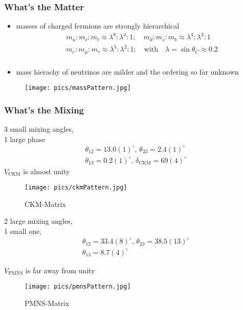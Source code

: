 \documentclass[hyperref={pdfpagelabels=false}]{beamer}
\begin{document}
\begin{frame}
\frametitle{What's the Matter}
  \begin{itemize}
   \item masses of charged fermions are strongly hierarchical
   \begin{align*}
    &m_u : m_c : m_t \approx \lambda^8 : \lambda^4:1; \quad m_d : m_s : m_b \approx \lambda^4 : \lambda^2:1\\
    &m_e : m_\mu : m_\tau \approx \lambda^5 : \lambda^2:1; \quad \text{with}\quad \lambda = \sin\theta_C \approx 0.2\\
   \end{align*}
   \item mass hierachy of neutrinos are milder and the ordering so far unknown
  \end{itemize}
   \begin{figure}[H]
 \texttt{[image: pics/massPattern.jpg]}

 \centering
 \end{figure}

\end{frame} 
\begin{frame}
\frametitle{What's the Mixing}
\begin{minipage}{0.49\textwidth}
3 small mixing angles,  \\ 1 large phase
\begin{align*}
 &\theta_{12} = 13.0(1)^\circ, \, \theta_{23} = 2.4(1)^\circ\\
 &\theta_{13} = 0.2(1)^\circ, \, \delta_{\text{CKM}} = 69(4)^\circ
\end{align*}
$V_\text{CKM}$ is almost unity
\begin{figure}
 \texttt{[image: pics/ckmPattern.jpg]}
 \caption{CKM-Matrix}
 \centering 
\end{figure}
\end{minipage}
\begin{minipage}{0.49\textwidth}
2 large mixing angles,\\ 1 small one,
\begin{align*}
 &\theta_{12} = 33.4(8)^\circ, \, \theta_{23} = 38.5(13)^\circ\\
 &\theta_{13} = 8.7(4)^\circ 
\end{align*}

$V_\text{PMNS}$ is far away from unity

 \begin{figure}
 \texttt{[image: pics/pmnsPattern.jpg]}
 \caption{PMNS-Matrix}
 \centering 
 \end{figure}
\end{minipage}
\end{frame}
\end{document}
